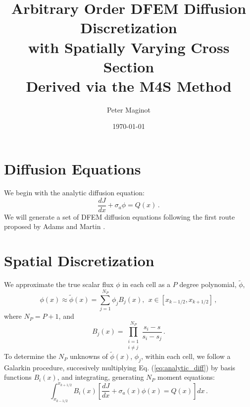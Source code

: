 \documentclass[11pt]{article}
\newcommand{\benum}{\begin{equation}}
\newcommand{\eenum}{\end{equation}}
\newcommand{\be}{\begin{equation*}}
\newcommand{\ee}{\end{equation*}}
\newcommand{\eqt}[1]{Eq. (\ref{#1})}
\newcommand{\B}[1]{\ensuremath{{B_{#1} }}}
\newcommand{\p}{\ensuremath{ d}}
\newcommand{\pec}{\, ,}
\newcommand{\pep}{\, .}
\begin{document}
\author{Peter Maginot}
\date{\today}
\title{Arbitrary Order DFEM Diffusion Discretization \\
with Spatially Varying Cross Section\\
Derived via the M4S Method}
\maketitle
\section{Diffusion Equations}
We begin with the analytic diffusion equation:
\benum
\frac{\p J}{\p x} + \sigma_a \phi = Q(x) \pep
\label{eq:analytic_diff}
\eenum
We will generate a set of DFEM diffusion equations following the first route proposed by Adams and Martin \cite{M4S}.  

\section{Spatial Discretization}

We approximate the true scalar flux $\phi$ in each cell as a $P$ degree polynomial, $\widetilde{\phi}$,
\benum
\label{eq:phi_def}
\phi(x) \approx   \widetilde{\phi}(x) = \sum_{j=1}^{N_P}{\phi_j\B{j}(x) }, ~~x\in[x_{k-1/2},x_{k+1/2}] \pec
\eenum
where $N_P = P+1$, and
\be
\B{j}(x) = \prod_{\substack{i=1 \\ i\neq j}}^{N_P}{ \frac{s_i - s}{s_i - s_j}} \pep
\ee
To determine the $N_P$ unknowns of $\widetilde{\phi}(x)$, $\phi_j$, within each cell, we follow a Galarkin procedure, succesively multiplying \eqt{eq:analytic_diff} by basis functions $\B{i}(x)$, and integrating, generating $N_P$ moment equations:
\benum
\int_{x_{k-1/2}}^{x_{k+1/2}}{\B{i}(x)\left[\frac{\p J}{\p x} + \sigma_a(x) \phi(x) = Q(x)  \right]dx} \pep
\label{eq:raw_basis}
\eenum
\end{document}
